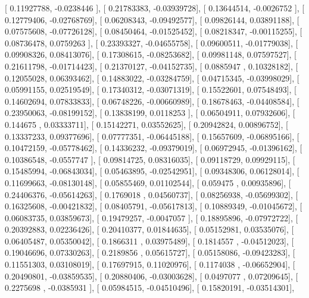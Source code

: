 \documentclass{article}
\begin{document}
       [ 0.11927788, -0.0238446 ],
       [ 0.21783383, -0.03939728],
       [ 0.13644514, -0.0026752 ],
       [ 0.12779406, -0.02768769],
       [ 0.06208343, -0.09492577],
       [ 0.09826144,  0.03891188],
       [ 0.07575608, -0.07726128],
       [ 0.08450464, -0.01525452],
       [ 0.08218347, -0.00115255],
       [ 0.08736478,  0.0759263 ],
       [ 0.23393327, -0.04655758],
       [ 0.09600511, -0.01779038],
       [ 0.09908326,  0.08413076],
       [ 0.17308615, -0.08253682],
       [ 0.09981148,  0.07597527],
       [ 0.21611798, -0.01714423],
       [ 0.21370127, -0.04152735],
       [ 0.0885947 ,  0.10328182],
       [ 0.12055028,  0.06393462],
       [ 0.14883022, -0.03284759],
       [ 0.04715345, -0.03998029],
       [ 0.05991155,  0.02519549],
       [ 0.17340312, -0.03071319],
       [ 0.15522601,  0.07548493],
       [ 0.14602694,  0.07833833],
       [ 0.06748226, -0.00660989],
       [ 0.18678463, -0.04408584],
       [ 0.23950063, -0.08199152],
       [ 0.13838199,  0.0118253 ],
       [ 0.06504911,  0.07932606],
       [ 0.144675  ,  0.03333711],
       [ 0.15142271,  0.03552625],
       [ 0.20942824,  0.00896752],
       [ 0.13337233,  0.09377696],
       [ 0.07777351, -0.06445188],
       [ 0.15657609, -0.06895166],
       [ 0.10472159, -0.05778462],
       [ 0.14336232, -0.09379019],
       [ 0.06972945, -0.01396162],
       [ 0.10386548, -0.0557747 ],
       [ 0.09814725,  0.08316035],
       [ 0.09118729,  0.09929115],
       [ 0.15485994, -0.06843034],
       [ 0.05463895, -0.02542951],
       [ 0.09348306,  0.06128014],
       [ 0.11699663, -0.08130148],
       [ 0.05855469,  0.01102544],
       [ 0.059475  ,  0.00935896],
       [ 0.24406376, -0.05614263],
       [ 0.1769018 ,  0.04560737],
       [ 0.08256938, -0.05699302],
       [ 0.16325608, -0.00421832],
       [ 0.08405791, -0.05617813],
       [ 0.10889349, -0.01045672],
       [ 0.06083735,  0.03859673],
       [ 0.19479257, -0.0047057 ],
       [ 0.18895896, -0.07972722],
       [ 0.20392883,  0.02236426],
       [ 0.20410377,  0.01844635],
       [ 0.05152981,  0.03535076],
       [ 0.06405487,  0.05350042],
       [ 0.1866311 ,  0.03975489],
       [ 0.1814557 , -0.04512023],
       [ 0.19046696,  0.07330263],
       [ 0.2189856 ,  0.05615727],
       [ 0.05158086, -0.09423283],
       [ 0.11551303,  0.03108019],
       [ 0.17697915,  0.11020976],
       [ 0.1174038 , -0.06652904],
       [ 0.20490801, -0.03859535],
       [ 0.20880406, -0.03003628],
       [ 0.0497077 ,  0.07209645],
       [ 0.2275698 , -0.0385931 ],
       [ 0.05984515, -0.04510496],
       [ 0.15820191, -0.03514301],
\end{document}
